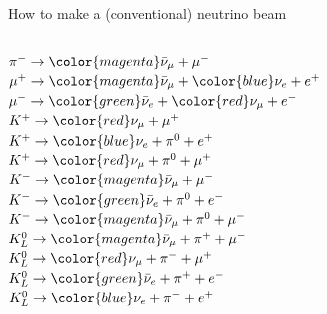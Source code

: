 \begin{frame}[t]{How to make a (conventional) neutrino beam}
\begin{columns}
\begin{column}{0.22\textwidth}
\begin{block}{}
{    $\pi^{-} \rightarrow {\color{magenta}\bar{\nu}_{\mu}} + \mu^{-}$\\
    $\mu^{+} \rightarrow {\color{magenta}\bar{\nu}_{\mu}} + {\color{blue}\nu_{e}} + e^{+}$\\
    $\mu^{-} \rightarrow {\color{green}\bar{\nu}_{e}} + {\color{red}\nu_{\mu}} + e^{-}$\\
    $K^{+} \rightarrow {\color{red}\nu_{\mu}} + \mu^{+}$\\
    $K^{+} \rightarrow {\color{blue}\nu_{e}} + \pi^{0} + e^{+}$\\
    $K^{+} \rightarrow {\color{red}\nu_{\mu}} + \pi^{0} + \mu^{+}$\\
    $K^{-} \rightarrow {\color{magenta}\bar{\nu}_{\mu}} + \mu^{-}$\\
    $K^{-} \rightarrow {\color{green}\bar{\nu}_{e}} + \pi^{0} + e^{-}$\\
    $K^{-} \rightarrow {\color{magenta}\bar{\nu}_{\mu}} + \pi^{0} + \mu^{-}$\\
    $K_{L}^{0} \rightarrow {\color{magenta}\bar{\nu}_{\mu}} + \pi^{+} + \mu^{-}$\\
    $K_{L}^{0} \rightarrow {\color{red}\nu_{\mu}} + \pi^{-} + \mu^{+}$\\
    $K_{L}^{0} \rightarrow {\color{green}\bar{\nu}_{e}} + \pi^{+} + e^{-}$\\
    $K_{L}^{0} \rightarrow {\color{blue}\nu_{e}} + \pi^{-} + e^{+}$\\
  }
  \end{block}
  \end{column}
\end{columns}
\end{frame}


